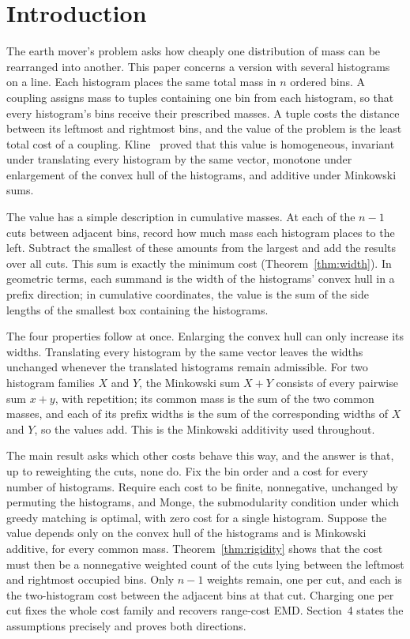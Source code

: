 \documentclass[11pt]{article}
\theoremstyle{definition}\newtheorem{definition}[theorem]{Definition}
\newcommand{\1}{\mathbf 1}
\begin{document}
\section{Introduction}
The earth mover's problem asks how cheaply one distribution of mass can be
rearranged into another. This paper concerns a version with several histograms
on a line. Each histogram places the same total mass in $n$ ordered bins. A
coupling assigns mass to tuples containing one bin from each histogram, so that
every histogram's bins receive their prescribed masses. A tuple costs the
distance between its leftmost and rightmost bins, and the value of the problem
is the least total cost of a coupling. Kline~\cite{kline} proved that this
value is homogeneous, invariant under translating every histogram by the same
vector, monotone under enlargement of the convex hull of the histograms, and
additive under Minkowski sums.

The value has a simple description in cumulative masses. At each of the $n-1$
cuts between adjacent bins, record how much mass each histogram places to the
left. Subtract the smallest of these amounts from the largest and add the
results over all cuts. This sum is exactly the minimum cost
(Theorem~\ref{thm:width}). In geometric terms, each summand is the width of the
histograms' convex hull in a prefix direction; in cumulative coordinates, the
value is the sum of the side lengths of the smallest box containing the
histograms.

The four properties follow at once. Enlarging the convex hull can only
increase its widths. Translating every histogram by the same vector leaves the
widths unchanged whenever the translated histograms remain admissible. For two
histogram families $X$ and $Y$, the Minkowski sum $X+Y$ consists of every
pairwise sum $x+y$, with repetition; its common mass is the sum of the two
common masses, and each of its prefix widths is the sum of the corresponding
widths of $X$ and $Y$, so the values add. This is the Minkowski additivity used
throughout.

The main result asks which other costs behave this way, and the answer is that,
up to reweighting the cuts, none do. Fix the bin order and a cost for every
number of histograms. Require each cost to be finite, nonnegative, unchanged by
permuting the histograms, and Monge, the submodularity condition under which
greedy matching is optimal, with zero cost for a single histogram. Suppose the
value depends only on the convex hull of the histograms and is Minkowski
additive, for every common mass. Theorem~\ref{thm:rigidity} shows that the cost
must then be a nonnegative weighted count of the cuts lying between the
leftmost and rightmost occupied bins. Only $n-1$ weights remain, one per cut,
and each is the two-histogram cost between the adjacent bins at that cut.
Charging one per cut fixes the whole cost family and recovers range-cost EMD.
Section~4 states the assumptions precisely and proves both directions.
\end{document}
